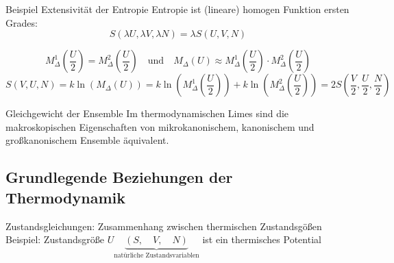 \begin{beispiel}{Beispiel Extensivität der Entropie}
Entropie ist (lineare) homogen Funktion ersten Grades:
\begin{equation}
    S(\lambda U, \lambda V, \lambda N) = \lambda S(U,V,N)
\end{equation}
\begin{center}
\end{center}
\begin{equation}
    M_{\Delta}^1 \left(\frac{U}{2}\right) = M_{\Delta}^2 \left(\frac{U}{2}\right) \quad \text{und} \quad M_{\Delta} (U) \approx M_{\Delta}^1 \left(\frac{U}{2}\right) \cdot M_{\Delta}^2 \left(\frac{U}{2}\right)
\end{equation}
\begin{equation}
    S(V,U,N) = k \ln(M_{\Delta}(U)) = k \ln\left( M_{\Delta}^1 \left(\frac{U}{2}\right) \right) + k \ln\left( M_{\Delta}^2 \left(\frac{U}{2}\right) \right) = 2 S\left(\frac{V}{2},\frac{U}{2},\frac{N}{2} \right)
\end{equation}
\end{beispiel}

\begin{prop}{Gleichgewicht der Ensemble}
    Im thermodynamischen Limes sind die makroskopischen Eigenschaften von mikrokanonischem, kanonischem und großkanonischem Ensemble äquivalent.
\end{prop}


\subsection{Grundlegende Beziehungen der Thermodynamik}
Zustandsgleichungen: Zusammenhang zwischen thermischen Zustandsgößen\\
Beispiel: Zustandsgröße $U\underbrace{(S, \quad V, \quad N)}_{\text{natürliche Zustandsvariablen}}$ ist ein thermisches Potential
